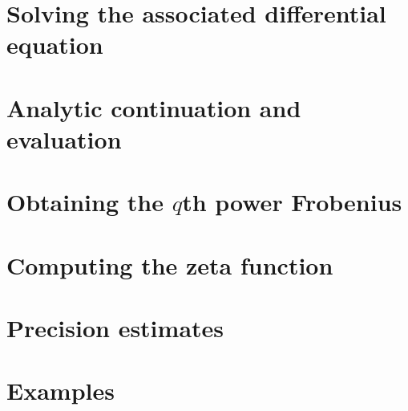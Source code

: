 
\chapter{Solving the associated differential equation}


\chapter{Analytic continuation and evaluation}


\chapter{Obtaining the $q$th power Frobenius}


\chapter{Computing the zeta function}


\chapter{Precision estimates}




\chapter{Examples}

